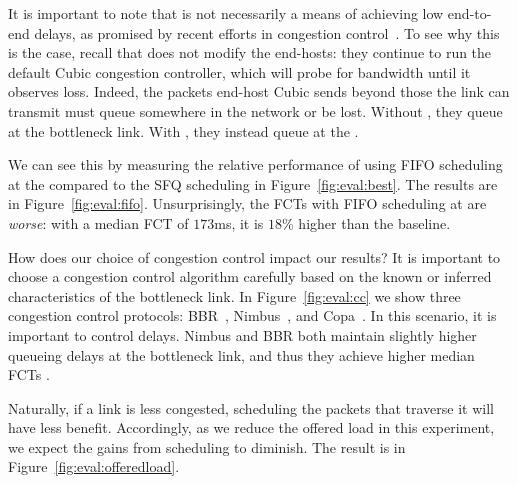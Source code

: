  It is important to note that \name is not necessarily a means of achieving low end-to-end delays, as promised by recent efforts in congestion control~\cite{copa, nimbus}. 
To see why this is the case, recall that \name does not modify the end-hosts: they continue to run the default Cubic congestion controller, which will probe for bandwidth until it observes loss.
Indeed, the packets end-host Cubic sends beyond those the link can transmit must queue somewhere in the network or be lost. Without \name, they queue at the bottleneck link.
With \name, they instead queue at the \inbox.



We can see this by measuring the relative performance of using FIFO scheduling at the \name compared to the SFQ scheduling in Figure~\ref{fig:eval:best}.
The results are in Figure~\ref{fig:eval:fifo}. 
Unsurprisingly, the FCTs with FIFO scheduling at \name are \emph{worse}: with a median FCT of $173$ms, it is $18$\% higher than the baseline.

 How does our choice of congestion control impact our results? 
It is important to choose a congestion control algorithm carefully based on the known or inferred characteristics of the bottleneck link. 
In Figure~\ref{fig:eval:cc} we show three congestion control protocols: BBR~\cite{bbr}, Nimbus~\cite{nimbus}, and Copa~\cite{copa}.
In this scenario, it is important to control delays. Nimbus and BBR both maintain slightly higher queueing delays at the bottleneck link, and thus they achieve higher median FCTs .



 Naturally, if a link is less congested, scheduling the packets that traverse it will have less benefit. Accordingly, as we reduce the offered load in this experiment, we expect the gains from scheduling to diminish. The result is in Figure~\ref{fig:eval:offeredload}.

